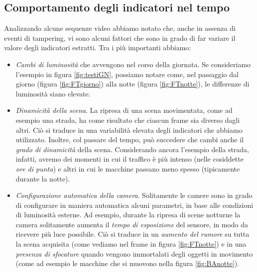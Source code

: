 \subsection{Comportamento degli indicatori nel tempo}
Analizzando alcune sequenze video abbiamo notato che, anche in assenza di eventi di tampering, vi sono alcuni fattori che sono in grado di far variare il valore degli indicatori estratti.
Tra i pi\`u importanti abbiamo:
\begin{itemize}
	\item \textit{Cambi di luminosit\`a} che avvengono nel corso della giornata. 
	Se consideriamo l'esempio in figura \ref{fig:testiGN}, possiamo notare come, nel passaggio dal giorno (figura \ref{fig:FTgiorno}) alla notte (figura \ref{fig:FTnotte}), le differenze di luminosit\`a siano elevate.  
%	
	\item \textit{Dinamicit\`a della scena}. La ripresa di una scena movimentata, come ad esempio una strada, ha come risultato che ciascun frame sia diverso dagli altri.
	Ci\`o si traduce in una variabilit\`a elevata degli indicatori che abbiamo utilizzato. 
	Inoltre, col passare del tempo, pu\`o succedere che cambi anche il \textit{grado di dinamicit\`a} della scena.
	Considerando ancora l'esempio della strada, infatti, avremo dei momenti in cui il traffico \`e pi\`u intenso (nelle cosiddette \textit{ore di punta}) e altri in cui le macchine passano meno spesso (tipicamente durante la notte).
	\item \textit{Configurazione automatica della camera}. Solitamente le camere sono in grado di configurare in maniera automatica alcuni parametri, in base alle condizioni di luminosit\`a esterne.
	Ad esempio, durante la ripresa di scene notturne la camera solitamente aumenta il \textit{tempo di esposizione} del sensore, in modo da ricevere pi\`u luce possibile.
	Ci\`o si traduce in un \textit{aumento del rumore} su tutta la scena acquisita (come vediamo nel frame in figura \ref{fig:FTnotte}) e in una \textit{presenza di sfocature} quando vengono immortalati degli oggetti in movimento (come ad esempio le macchine che si muovono nella figura \ref{fig:BAnotte}).
\end{itemize} 
